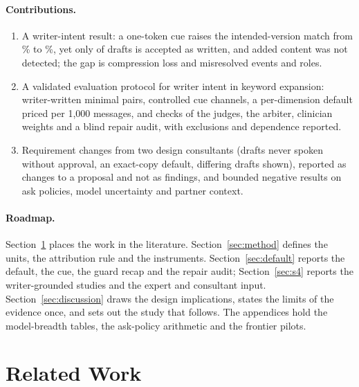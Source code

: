 \paragraph{Contributions.}
\begin{enumerate}
\item A writer-intent result: a one-token cue raises the intended-version match from \jmpOneEightMatchBare{}\% to \jmpOneEightMatchChip{}\%, yet only \jmpOneEightAcceptYesK{} of \jmpOneEightAcceptN{} drafts is accepted as written, and added content was not detected; the gap is compression loss and misresolved events and roles.
\item A validated evaluation protocol for writer intent in keyword expansion: writer-written minimal pairs, controlled cue channels, a per-dimension default priced per 1,000 messages, and checks of the judges, the arbiter, clinician weights and a blind repair audit, with exclusions and dependence reported.
\item Requirement changes from two design consultants (drafts never spoken without approval, an exact-copy default, differing drafts shown), reported as changes to a proposal and not as findings, and bounded negative results on ask policies, model uncertainty and partner context.
\end{enumerate}

\paragraph{Roadmap.}
Section~\ref{sec:related} places the work in the literature. Section~\ref{sec:method} defines the units, the attribution rule and the instruments. Section~\ref{sec:default} reports the default, the cue, the guard recap and the repair audit; Section~\ref{sec:s4} reports the writer-grounded studies and the expert and consultant input. Section~\ref{sec:discussion} draws the design implications, states the limits of the evidence once, and sets out the study that follows. The appendices hold the model-breadth tables, the ask-policy arithmetic and the frontier pilots.


\section{Related Work}\label{sec:related}


